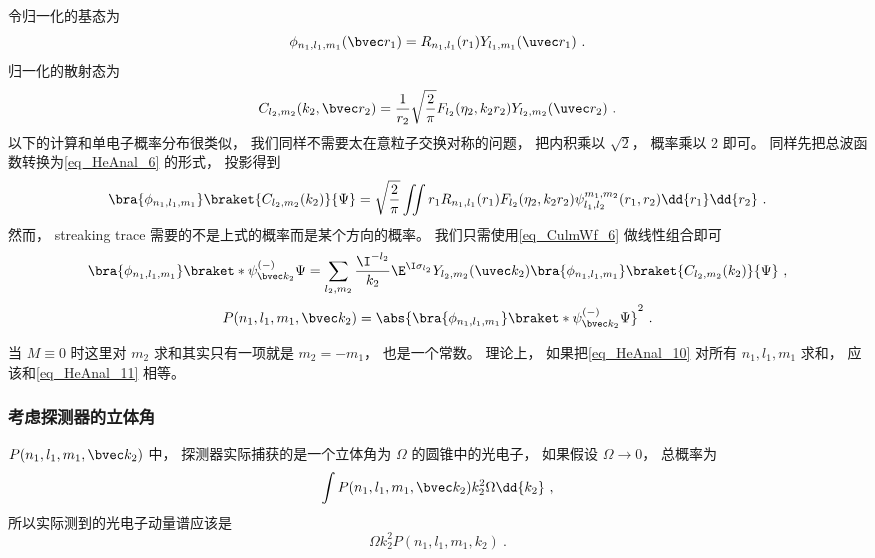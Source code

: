 令归一化的基态为
\begin{equation}
\phi_{n_1, l_1, m_1}(\bvec r_1) = R_{n_1,l_1}(r_1)Y_{l_1,m_1}(\uvec r_1)~.
\end{equation}
归一化的散射态为
\begin{equation}
C_{l_2, m_2}(k_2, \bvec r_2) = \frac{1}{r_2}\sqrt{\frac{2}{\pi}} F_{l_2}(\eta_2, k_2 r_2) Y_{l_2, m_2} (\uvec r_2)~.
\end{equation}
以下的计算和单电子概率分布很类似， 我们同样不需要太在意粒子交换对称的问题， 把内积乘以 $\sqrt{2}$， 概率乘以 2 即可。 同样先把总波函数转换为\autoref{eq_HeAnal_6} 的形式， 投影得到
\begin{equation}\label{eq_HeAnal_36}
\bra{\phi_{n_1, l_1, m_1}}\braket{C_{l_2, m_2}(k_2)}{\Psi} = \sqrt{\frac{2}{\pi}} \iint r_1 R_{n_1,l_1}(r_1) F_{l_2}(\eta_2, k_2 r_2) \psi_{l_1, l_2}^{m_1, m_2}(r_1, r_2) \dd{r_1} \dd{r_2}~.
\end{equation}
然而， streaking trace 需要的不是上式的概率而是某个方向的概率。 我们只需使用\autoref{eq_CulmWf_6}  做线性组合即可
\begin{equation}
\bra{\phi_{n_1, l_1, m_1}}\braket*{\psi_{\bvec k_2}^{(-)}}{\Psi} = \sum_{l_2,m_2} \frac{\I^{-l_2}}{k_2} \E^{\I\sigma_{l_2}} Y_{l_2,m_2}(\uvec k_2) \bra{\phi_{n_1, l_1, m_1}}\braket{C_{l_2, m_2}(k_2)}{\Psi} ~,
\end{equation}
\begin{equation}\label{eq_HeAnal_10}
P(n_1, l_1, m_1, \bvec k_2) = \abs{\bra{\phi_{n_1, l_1, m_1}}\braket*{\psi_{\bvec k_2}^{(-)}}{\Psi}}^2~.
\end{equation}

当 $M \equiv 0$ 时这里对 $m_2$ 求和其实只有一项就是 $m_2 = - m_1$， 也是一个常数。 理论上， 如果把\autoref{eq_HeAnal_10} 对所有 $n_1, l_1, m_1$ 求和， 应该和\autoref{eq_HeAnal_11} 相等。


\subsubsection{考虑探测器的立体角}
$P(n_1, l_1, m_1, \bvec k_2)$ 中， 探测器实际捕获的是一个立体角为 $\Omega$ 的圆锥中的光电子， 如果假设 $\Omega \to 0$， 总概率为
\begin{equation}
\int P(n_1, l_1, m_1, \bvec k_2) k_2^2 \Omega \dd{k_2}~,
\end{equation}
所以实际测到的光电子动量谱应该是
\begin{equation}
\Omega k_2^2 P(n_1, l_1, m_1, k_2)~.
\end{equation}

